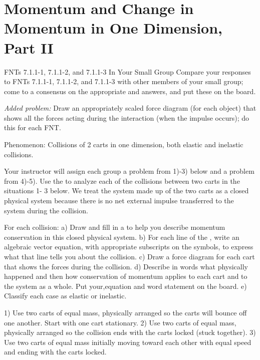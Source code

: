 \section{Momentum and Change in Momentum in One Dimension, Part II}

\begin{fnt}
	
\end{fnt}

\begin{fnt}
	
\end{fnt}

\begin{fnt}
	
\end{fnt}

FNTs  7.1.1-1,  7.1.1-2,  and  7.1.1-3
 In Your Small Group
Compare your responses to FNTs 7.1.1-1, 7.1.1-2, and 7.1.1-3 with other members of your small group; come to a consensus on the appropriate \pcharts{} and answers, and put these on the board.

\textit{Added problem:} Draw an appropriately scaled force diagram (for each object) that shows all the forces acting during the interaction (when the impulse occurs); do this for each FNT.
\WCD

Phenomenon:  Collisions of 2 carts in one dimension, both elastic and inelastic collisions.

Your instructor will assign each group a problem from 1)-3) below and a problem from 4)-5). Use the \pConsModel{} to analyze each of the collisions between two carts in the situations 1- 3 below. We treat the system made up of the two carts as a closed physical system because there is no net external impulse transferred to the system during the collision.

For each collision:
a)	Draw and fill in a \pchart{} to help you describe momentum conservation in this closed physical system.
b)	For each line of the \pchart{}, write an algebraic vector equation, with appropriate subscripts on the symbols, to express what that line tells you about the collision.
c)	Draw a force diagram for each cart that shows the forces during the collision. 
d)   Describe in words what physically happened and then how conservation of momentum applies to each cart and to the system as a whole. Put your,equation and word statement on the board.
e)   Classify each case as elastic or inelastic.

1)	Use two carts of equal mass, physically arranged so the carts will bounce off one another. Start with one cart stationary.
2)	Use two carts of equal mass, physically arranged so the collision ends with the carts locked (stuck together). 
3)	Use two carts of equal mass initially moving toward each other with equal speed and ending with the carts locked.

